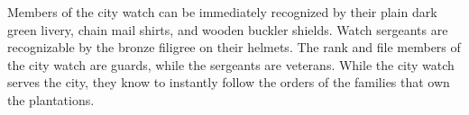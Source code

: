 Members of the city watch can be immediately recognized by their plain dark green livery, chain mail shirts, and wooden buckler shields.
Watch sergeants are recognizable by the bronze filigree on their helmets.
The rank and file members of the city watch are guards, while the sergeants are veterans.
While the city watch serves the city, they know to instantly follow the orders of the families that own the plantations.
